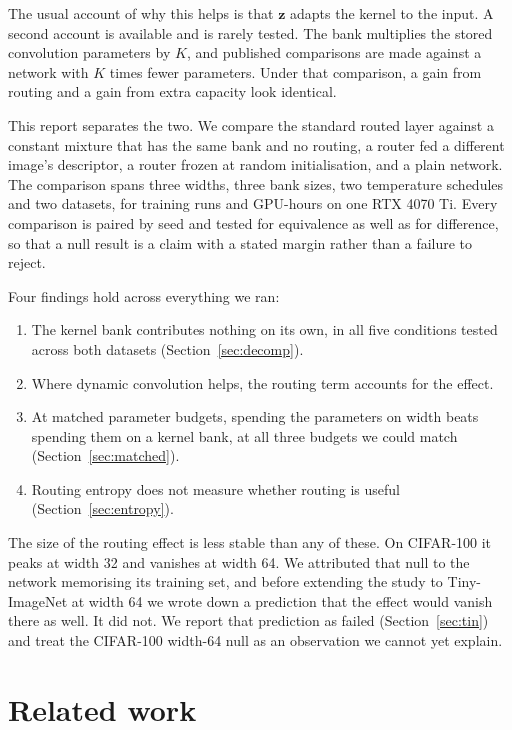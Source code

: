 \documentclass[10pt,a4paper]{article}
\newcommand{\zv}{\mathbf{z}}
\begin{document}
The usual account of why this helps is that $\zv$ adapts the kernel to
the input. A second account is available and is rarely tested. The bank
multiplies the stored convolution parameters by $K$, and published
comparisons are made against a network with $K$ times fewer parameters.
Under that comparison, a gain from routing and a gain from extra
capacity look identical.

This report separates the two. We compare the standard routed layer
against a constant mixture that has the same bank and no routing, a
router fed a different image's descriptor, a router frozen at random
initialisation, and a plain network. The comparison spans three widths,
three bank sizes, two temperature schedules and two datasets, for
 training runs and  GPU-hours on one RTX 4070 Ti. Every
comparison is paired by seed and tested for equivalence as well as for
difference, so that a null result is a claim with a stated margin
rather than a failure to reject.

Four findings hold across everything we ran:
\begin{enumerate}\setlength\itemsep{1pt}
\item The kernel bank contributes nothing on its own, in all five
conditions tested across both datasets (Section~\ref{sec:decomp}).
\item Where dynamic convolution helps, the routing term accounts for the
effect.
\item At matched parameter budgets, spending the parameters on width
beats spending them on a kernel bank, at all three budgets we could
match (Section~\ref{sec:matched}).
\item Routing entropy does not measure whether routing is useful
(Section~\ref{sec:entropy}).
\end{enumerate}

The size of the routing effect is less stable than any of these. On
CIFAR-100 it peaks at width 32 and vanishes at width 64. We attributed
that null to the network memorising its training set, and before
extending the study to Tiny-ImageNet at width 64 we wrote down a
prediction that the effect would vanish there as well. It did not. We
report that prediction as failed (Section~\ref{sec:tin}) and treat the
CIFAR-100 width-64 null as an observation we cannot yet explain.

\section{Related work}
\end{document}

